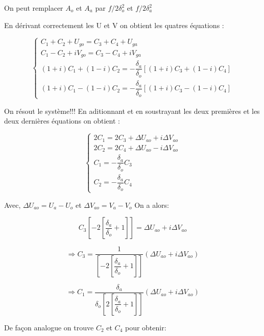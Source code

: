 \documentclass[11pt,a4paper,titlepage]{article}
\begin{document}
On peut remplacer $A_{o}$ et $A_{a}$ par $f/2 \delta_o^2$ et $f/2 \delta_a^2$ 

En dérivant correctement les U et V on obtient les quatres équations :

\begin{equation}
\begin{cases} 
C_1 + C_2 + U_{go} = C_3 + C_4 + U_{ga} \\
C_1 - C_2 + i V_{go} = C_3 - C_4 + i V_{ga}\\
(1+i)C_1 + (1-i) C_2 = - \dfrac{\delta_a}{\delta_o}\left[(1+i)C_3 + (1-i) C_4\right]\\ 
(1+i)C_1 - (1-i) C_2 = - \dfrac{\delta_a}{\delta_o}\left[(1+i)C_3 - (1-i) C_4\right]
\end{cases}
\end{equation}

On résout le système!!!
\pagebreak
En aditionnant et en soustrayant les deux premières et les deux dernières équations on obtient :

\begin{equation}
\begin{cases} 
2 C_1 = 2 C_3 + \Delta U_{ao} + i \Delta V_{ao} \\
2 C_2 = 2 C_4 + \Delta U_{ao} - i \Delta V_{ao} \\
C_1 = -\dfrac{\delta_a}{\delta_o}C_3 \\
C_2 = -\dfrac{\delta_a}{\delta_o} C_4
\end{cases}
\end{equation}

Avec, $\Delta U_{ao} = U_a-U_o$ et  $\Delta V_{ao}= V_a-V_o$ 
On a alors: 

\begin{equation}
C_3 \left[-2\left[\dfrac{\delta_a}{\delta_o}+1\right]\right] = \Delta U_{ao} + i \Delta V_{ao} 
\end{equation}

\begin{equation}
\Rightarrow C_3 =\dfrac{1}{\left[-2\left[\dfrac{\delta_a}{\delta_o}+1\right]\right] } (\Delta U_{ao} + i \Delta V_{ao}) 
\end{equation}

\begin{equation}
\Rightarrow C_1 =\dfrac{\delta_a}{\delta_o \left[2\left[\dfrac{\delta_a}{\delta_o}+1\right]\right] } (\Delta U_{ao} + i \Delta V_{ao}) 
\end{equation}

De façon analogue on trouve $C_2$ et $C_4$ pour obtenir:
\end{document}
